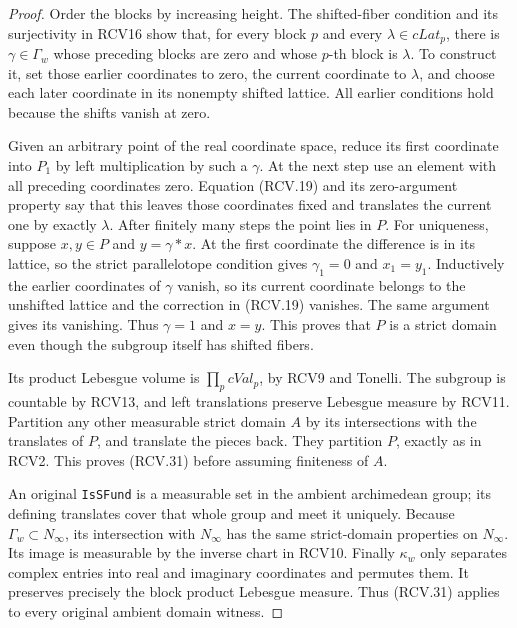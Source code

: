 \documentclass[11pt,a4paper]{article}
\numberwithin{equation}{section}
\theoremstyle{remark}\newtheorem{remark}[theorem]{Remark}
\begin{document}
\begin{proof}
Order the blocks by increasing height.  The shifted-fiber condition
and its surjectivity in RCV16 show that, for every block \(p\)
and every \(\lambda\in cLat_p\), there is \(\gamma\in\Gamma_w\)
whose preceding blocks are zero and whose \(p\)-th block is
\(\lambda\).  To construct it, set those earlier coordinates to
zero, the current coordinate to \(\lambda\), and choose each
later coordinate in its nonempty shifted lattice.  All earlier
conditions hold because the shifts vanish at zero.

Given an arbitrary point of the real coordinate space, reduce its
first coordinate into \(P_1\) by left multiplication by such a
\(\gamma\).  At the next step use an element with all preceding
coordinates zero.  Equation (RCV.19) and its zero-argument property
say that this leaves those coordinates fixed and translates the
current one by exactly \(\lambda\).  After finitely many steps
the point lies in \(P\).  For uniqueness, suppose \(x,y\in P\)
and \(y=\gamma*x\).  At the first coordinate the difference
is in its lattice, so the strict parallelotope condition gives
\(\gamma_1=0\) and \(x_1=y_1\).  Inductively the earlier
coordinates of \(\gamma\) vanish, so its current coordinate
belongs to the unshifted lattice and the correction in (RCV.19)
vanishes.  The same argument gives its vanishing.  Thus
\(\gamma=1\) and \(x=y\).  This proves that \(P\) is a
strict domain even though the subgroup itself has shifted fibers.

Its product Lebesgue volume is \(\prod_pcVal_p\), by RCV9 and
Tonelli.  The subgroup is countable by RCV13, and left translations
preserve Lebesgue measure by RCV11.  Partition any other measurable
strict domain \(A\) by its intersections with the translates of
\(P\), and translate the pieces back.  They partition \(P\),
exactly as in RCV2.  This proves (RCV.31) before assuming finiteness
of \(A\).

An original \texttt{Is\allowbreak SFund} is a measurable set in the ambient
archimedean group; its defining translates cover that whole group
and meet it uniquely.  Because \(\Gamma_w\subset N_\infty\),
its intersection with \(N_\infty\) has the same strict-domain
properties on \(N_\infty\).  Its image is measurable by the
inverse chart in RCV10.  Finally \(\kappa_w\) only separates
complex entries into real and imaginary coordinates and permutes
them.  It preserves precisely the block product Lebesgue measure.
Thus (RCV.31) applies to every original ambient domain witness.
\end{proof}
\end{document}
